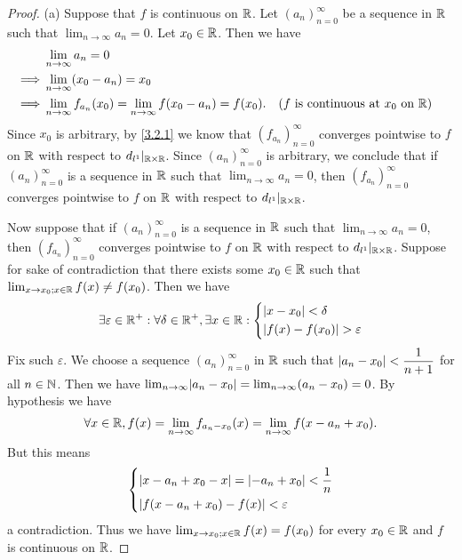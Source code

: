 \begin{proof}{(a)}
  Suppose that \(f\) is continuous on \(\mathbb{R}\).
  Let \((a_n)_{n = 0}^\infty\) be a sequence in \(\mathbb{R}\) such that \(\lim_{n \to \infty} a_n = 0\).
  Let \(x_0 \in \mathbb{R}\).
  Then we have
  \begin{align*}
             & \lim_{n \to \infty} a_n = 0                                                                                                          \\
    \implies & \lim_{n \to \infty} (x_0 - a_n) = x_0                                                                                                \\
    \implies & \lim_{n \to \infty} f_{a_n}(x_0) = \lim_{n \to \infty} f(x_0 - a_n) = f(x_0). &  & \text{(\(f\) is continuous at \(x_0\) on \(\mathbb{R}\))}
  \end{align*}
  Since \(x_0\) is arbitrary, by \cref{3.2.1} we know that \((f_{a_n})_{n = 0}^\infty\) converges pointwise to \(f\) on \(\mathbb{R}\) with respect to \(d_{l^1}|_{\mathbb{R} \times \mathbb{R}}\).
  Since \((a_n)_{n = 0}^\infty\) is arbitrary, we conclude that if \((a_n)_{n = 0}^\infty\) is a sequence in \(\mathbb{R}\) such that \(\lim_{n \to \infty} a_n = 0\), then \((f_{a_n})_{n = 0}^\infty\) converges pointwise to \(f\) on \(\mathbb{R}\) with respect to \(d_{l^1}|_{\mathbb{R} \times \mathbb{R}}\).

  Now suppose that if \((a_n)_{n = 0}^\infty\) is a sequence in \(\mathbb{R}\) such that \(\lim_{n \to \infty} a_n = 0\), then \((f_{a_n})_{n = 0}^\infty\) converges pointwise to \(f\) on \(\mathbb{R}\) with respect to \(d_{l^1}|_{\mathbb{R} \times \mathbb{R}}\).
  Suppose for sake of contradiction that there exists some \(x_0 \in \mathbb{R}\) such that \(\lim_{x \to x_0 ; x \in \mathbb{R}} f(x) \neq f(x_0)\).
  Then we have
  \[
    \exists \varepsilon \in \mathbb{R}^+ : \forall \delta \in \mathbb{R}^+, \exists x \in \mathbb{R} : \begin{dcases}
      \left\lvert x - x_0\right\rvert < \delta \\
      \left\lvert f(x) - f(x_0)\right\rvert > \varepsilon
    \end{dcases}
  \]
  Fix such \(\varepsilon\).
  We choose a sequence \((a_n)_{n = 0}^\infty\) in \(\mathbb{R}\) such that \(\left\lvert a_n - x_0\right\rvert < \dfrac{1}{n + 1}\) for all \(n \in \mathbb{N}\).
  Then we have \(\lim_{n \to \infty} \abs{a_n - x_0} = \lim_{n \to \infty} (a_n - x_0) = 0\).
  By hypothesis we have
  \[
    \forall x \in \mathbb{R}, f(x) = \lim_{n \to \infty} f_{a_n - x_0}(x) = \lim_{n \to \infty} f(x - a_n + x_0).
  \]
  But this means
  \[
    \begin{dcases}
      \left\lvert x - a_n + x_0 - x\right\rvert = \left\lvert-a_n + x_0\right\rvert < \dfrac{1}{n} \\
      \left\lvert f(x - a_n + x_0) - f(x)\right\rvert < \varepsilon
    \end{dcases}
  \]
  a contradiction.
  Thus we have \(\lim_{x \to x_0 ; x \in \mathbb{R}} f(x) = f(x_0)\) for every \(x_0 \in \mathbb{R}\) and \(f\) is continuous on \(\mathbb{R}\).
\end{proof}

